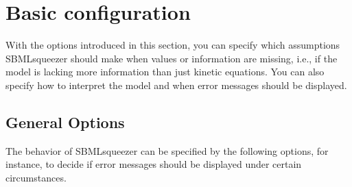 \section{Basic configuration}
\label{sec:Basic_configuration}
With the options introduced in this section, you can specify which assumptions
SBMLsqueezer should make when values or information are missing, i.e., if the 
model is lacking more information than just kinetic equations. You can also
specify how to interpret the model and when error messages should be displayed.

\subsection{General Options}
The behavior of SBMLsqueezer can be specified by the following options, for
instance, to decide if error messages should be displayed under
certain circumstances.
